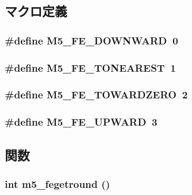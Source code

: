 \subsection{マクロ定義}
\hypertarget{fenv_8hh_a2f31df845f91d01bf7a00d35d2d6bdd8}{
\subsubsection[{M5\_\-FE\_\-DOWNWARD}]{\setlength{\rightskip}{0pt plus 5cm}\#define M5\_\-FE\_\-DOWNWARD~0}}
\label{fenv_8hh_a2f31df845f91d01bf7a00d35d2d6bdd8}
\hypertarget{fenv_8hh_a45ef7495cf3acb087c6e51c0872cb046}{
\subsubsection[{M5\_\-FE\_\-TONEAREST}]{\setlength{\rightskip}{0pt plus 5cm}\#define M5\_\-FE\_\-TONEAREST~1}}
\label{fenv_8hh_a45ef7495cf3acb087c6e51c0872cb046}
\hypertarget{fenv_8hh_a767c086da61e8f4503ff8bcbf63d2047}{
\subsubsection[{M5\_\-FE\_\-TOWARDZERO}]{\setlength{\rightskip}{0pt plus 5cm}\#define M5\_\-FE\_\-TOWARDZERO~2}}
\label{fenv_8hh_a767c086da61e8f4503ff8bcbf63d2047}
\hypertarget{fenv_8hh_a38de364735346e2242bd897024811e6c}{
\subsubsection[{M5\_\-FE\_\-UPWARD}]{\setlength{\rightskip}{0pt plus 5cm}\#define M5\_\-FE\_\-UPWARD~3}}
\label{fenv_8hh_a38de364735346e2242bd897024811e6c}


\subsection{関数}
\hypertarget{fenv_8hh_adfea66c9f7f222a8602303b7380bf8c2}{
\subsubsection[{m5\_\-fegetround}]{\setlength{\rightskip}{0pt plus 5cm}int m5\_\-fegetround ()}}
\label{fenv_8hh_adfea66c9f7f222a8602303b7380bf8c2}



